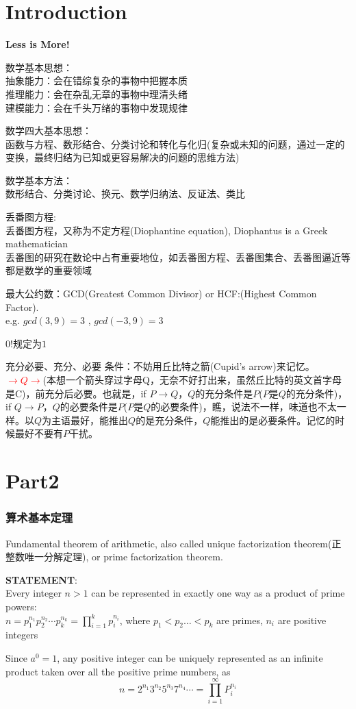 \documentclass[../main.tex]{subfiles}
\begin{document}
\part{Introduction}

\textbf{Less is More!}

数学基本思想：\\
抽象能力：会在错综复杂的事物中把握本质\\
推理能力：会在杂乱无章的事物中理清头绪\\
建模能力：会在千头万绪的事物中发现规律

数学四大基本思想：\\
函数与方程、数形结合、分类讨论和转化与化归(复杂或未知的问题，通过一定的变换，最终归结为已知或更容易解决的问题的思维方法)

数学基本方法：\\
数形结合、分类讨论、换元、数学归纳法、反证法、类比

丢番图方程:\\
丢番图方程，又称为不定方程(Diophantine equation), Diophantus is a Greek mathematician\\
丢番图的研究在数论中占有重要地位，如丢番图方程、丢番图集合、丢番图逼近等都是数学的重要领域

最大公约数：GCD(Greatest Common Divisor) or HCF:(Highest Common Factor).\\
e.g. $gcd(3,9)=3$ , $gcd(-3,9)=3$

$0!$规定为$1$

充分必要、充分、必要 条件：不妨用丘比特之箭(Cupid's arrow)来记忆。\\
\textcolor{red}{\textbf{$\to Q \to$}}(本想一个箭头穿过字母Q，无奈不好打出来，虽然丘比特的英文首字母是C)，前充分后必要。也就是，if $P\to Q$，$Q$的充分条件是$P$($P$是$Q$的充分条件)，if $Q\to P$，$Q$的必要条件是$P$($P$是$Q$的必要条件)，瞧，说法不一样，味道也不太一样。以$Q$为主语最好，能推出$Q$的是充分条件，$Q$能推出的是必要条件。记忆的时候最好不要有$P$干扰。
\clearpage
\part{Part2 }

\section{算术基本定理}
Fundamental theorem of arithmetic, also called unique factorization theorem(正整数唯一分解定理), or prime factorization theorem.

\begin{mdframed}
  \textbf{STATEMENT}:\\  Every integer $n>1$ can be represented in exactly one way as a product of prime powers:\\
  $ n = p_1^{n_1}p_2^{n_2}\cdots p_k^{n_k} = \prod_{i=1}^kp_i^{n_i}$, where $p_1<p_2\ldots <p_k$ are primes, $n_i$ are positive integers
\end{mdframed}
Since $a^0=1$, any positive integer can be uniquely represented as an infinite product taken over all the positive prime numbers, as
$$ n = 2^{n_1}3^{n_2}5^{n_3}7^{n_4}\cdots = \prod_{i=1}^{\infty}P_i^{n_i} $$
\end{document}
